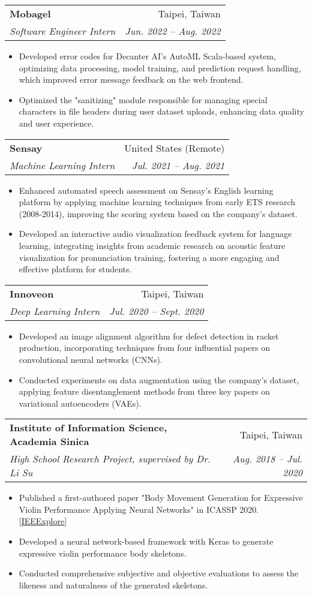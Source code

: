 \documentclass[letterpaper,11pt]{article}
\makeatletter
\newcommand{\resumeItem}[1]{
  \item\small{#1}
}
\newcommand{\resumeSubheading}[4]{
  \vspace{-1pt}\item
    \begin{tabular*}{0.97\textwidth}[t]{l@{\extracolsep{\fill}}r}
      \textbf{#1} & #2 \\
      \textit{\small#3} & \textit{\small #4} \\
    \end{tabular*}\vspace{-5pt}
}
\newcommand{\resumeItemListStart}{\begin{itemize}}
\newcommand{\resumeItemListEnd}{\end{itemize}\vspace{-5pt}}
\makeatother
\begin{document}
    \resumeSubheading
      {Mobagel}{Taipei, Taiwan}
      {Software Engineer Intern}{Jun. 2022 -- Aug. 2022}
      \resumeItemListStart
        \resumeItem{}{Developed error codes for Decanter AI's AutoML Scala-based system, optimizing data processing, model training, and prediction request handling, which improved error message feedback on the web frontend.}
        \resumeItem{}{Optimized the "sanitizing" module responsible for managing special characters in file headers during user dataset uploads, enhancing data quality and user experience.}
      \resumeItemListEnd

    \resumeSubheading
      {Sensay}{United States (Remote)}
      {Machine Learning Intern}{Jul. 2021 -- Aug. 2021}
      \resumeItemListStart
        \resumeItem{}{Enhanced automated speech assessment on Sensay's English learning platform by applying machine learning techniques from early ETS research (2008-2014), improving the scoring system based on the company's dataset.}
        \resumeItem{}{Developed an interactive audio visualization feedback system for language learning, integrating insights from academic research on acoustic feature visualization for pronunciation training, fostering a more engaging and effective platform for students.}
      \resumeItemListEnd
    
      \resumeSubheading
        {Innoveon}{Taipei, Taiwan}
        {Deep Learning Intern}{Jul. 2020 -- Sept. 2020}
        \resumeItemListStart
          \resumeItem{}{Developed an image alignment algorithm for defect detection in racket production, incorporating techniques from four influential papers on convolutional neural networks (CNNs).}
          \resumeItem{}{Conducted experiments on data augmentation using the company's dataset, applying feature disentanglement methods from three key papers on variational autoencoders (VAEs).}
        \resumeItemListEnd
      
        \resumeSubheading
          {Institute of Information Science, Academia Sinica}{Taipei, Taiwan}
          {High School Research Project, supervised by Dr. Li Su} {Aug. 2018 -- Jul. 2020}
          \resumeItemListStart
            \resumeItem{}{Published a first-authored paper "Body Movement Generation for Expressive Violin Performance Applying Neural Networks" in ICASSP 2020. [\href{https://ieeexplore.ieee.org/document/9054463}{IEEExplore}]}
            \resumeItem{}{Developed a neural network-based framework with Keras to generate expressive violin performance body skeletons.}
            \resumeItem{}{Conducted comprehensive subjective and objective evaluations to assess the likeness and naturalness of the generated skeletons.}
          \resumeItemListEnd
          
\end{document}
